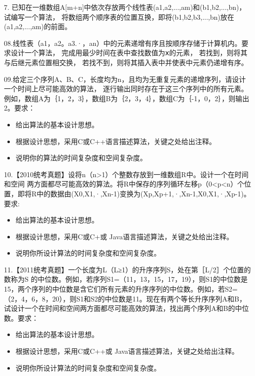 \documentclass[b5paper,11pt]{article}
\begin{document}
\psplit

\begin{question}
7. 已知在一维数组A[m+n]中依次存放两个线性表(a1,a2,...,am)和(b1,b2,...,bn)，试编写一个算法，
将数组两个顺序表的位置互换，即将(b1,b2,b3,...,bn)放在(a1,a2,...,am)的前面。
\end{question}

\psplit

\begin{question}
08.线性表（a1，a2。a3.·，an）中的元素递增有序且按顺序存储于计算机内。要求设计一个算法，
完成用最少时间在表中查找数值为ⅹ的元素，
若找到，则将其与后继元素位置相交换，
若找不到，则将其插入表中并使表中元素仍递增有序。
\end{question}

\psplit

\begin{question}
09.给定三个序列A、B、C，长度均为n，且均为无重复元素的递增序列，请设计一个时间上尽可能高效的算法，
逐行输出同时存在于这三个序列中的所有元素。
例如，数组A为｛1，2，3｝，数组B为｛2，3，4｝，数组C为｛-1，0，2｝，则输出2。要求：
\begin{itemize}
  \item [1）] 给出算法的基本设计思想。
  \item [2）] 根据设计思想，采用C或C++语言描述算法，关键之处给出注释。
  \item [3）] 说明你的算法的时间复杂度和空间复杂度。
\end{itemize}
\end{question}
\psplit

\begin{question}
10.【2010统考真题】设将n（n>1）个整数存放到一维数组R中。设计一个在时间和空间
两方面都尽可能高效的算法。将R中保存的序列循环左移p（0<p<n）个位置，即将R中的数据由(X0,X1,·,Xn-1)变换为(Xp,Xp+1,·,Xn-1,X0,X1,·,Xp-1)。
要求:
\begin{itemize}
  \item [1）] 给出算法的基本设计思想。
  \item [2）] 根据设计思想，采用C或C+或 Java语言描述算法，关键之处给出注释。
  \item [3）] 说明你所设计算法的时间复杂度和空间复杂度。
\end{itemize}
\end{question}

\psplit

\begin{question}
11.【2011统考真题】一个长度为L（L≥1）的升序序列S，处在第［L/2］个位置的数称为S
的中位数。例如，若序列S1=（11，13，15，17，19），则S1的中位数是15，两个序列的中位数是含它们所有元素的升序序列的中位数。例如，若S2=（2，4，6，8，20），则S1和S2的中位数是11。现在有两个等长升序序列A和B，试设计一个在时间和空间两方面都尽可能高效的算法，找出两个序列A和B的中位数。要求：
\begin{itemize}
  \item [1）] 给出算法的基本设计思想。
  \item [2）] 根据设计思想，采用C或C++或 Java语言描述算法，关键之处给出注释。
  \item [3）] 说明你所设计算法的时间复杂度和空间复杂度。
\end{itemize}
\end{question}
\end{document}
